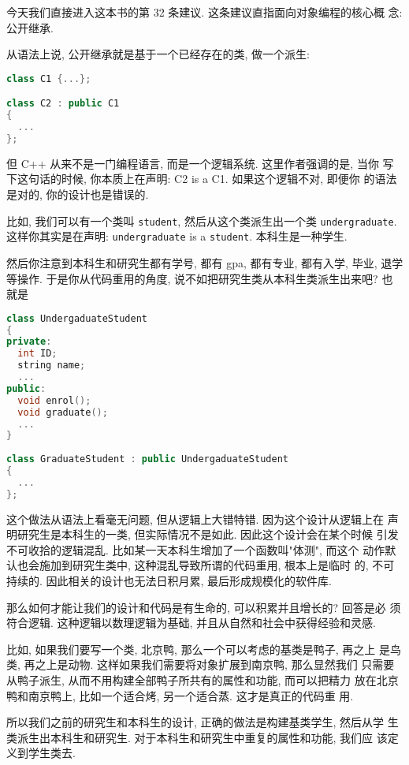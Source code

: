 \documentclass[a4paper]{ctexart}
\theoremstyle{definition}
\theoremstyle{definition}
\begin{document}
今天我们直接进入这本书的第 32 条建议. 这条建议直指面向对象编程的核心概
念: 公开继承.

从语法上说, 公开继承就是基于一个已经存在的类, 做一个派生:

\begin{lstlisting}[language=C++]
class C1 {...};

class C2 : public C1
{
  ...
};
\end{lstlisting}

但 C++ 从来不是一门编程语言, 而是一个逻辑系统. 这里作者强调的是, 当你
写下这句话的时候, 你本质上在声明: C2 is a C1. 如果这个逻辑不对, 即便你
的语法是对的, 你的设计也是错误的.

比如, 我们可以有一个类叫 \verb|student|, 然后从这个类派生出一个类
\verb|undergraduate|. 这样你其实是在声明: \verb|undergraduate| is a
\verb|student|. 本科生是一种学生.

然后你注意到本科生和研究生都有学号, 都有 gpa, 都有专业, 都有入学, 毕业,
退学等操作. 于是你从代码重用的角度, 说不如把研究生类从本科生类派生出来吧? 也就是

\begin{lstlisting}[language=C++]
class UndergaduateStudent
{
private:
  int ID;
  string name;
  ...
public:
  void enrol();
  void graduate();
  ...
} 
  
class GraduateStudent : public UndergaduateStudent
{
  ...
};
\end{lstlisting}

这个做法从语法上看毫无问题, 但从逻辑上大错特错. 因为这个设计从逻辑上在
声明研究生是本科生的一类, 但实际情况不是如此. 因此这个设计会在某个时候
引发不可收拾的逻辑混乱. 比如某一天本科生增加了一个函数叫"体测", 而这个
动作默认也会施加到研究生类中, 这种混乱导致所谓的代码重用, 根本上是临时
的, 不可持续的. 因此相关的设计也无法日积月累, 最后形成规模化的软件库.

那么如何才能让我们的设计和代码是有生命的, 可以积累并且增长的? 回答是必
须符合逻辑. 这种逻辑以数理逻辑为基础, 并且从自然和社会中获得经验和灵感.

比如, 如果我们要写一个类, 北京鸭, 那么一个可以考虑的基类是鸭子, 再之上
是鸟类, 再之上是动物. 这样如果我们需要将对象扩展到南京鸭, 那么显然我们
只需要从鸭子派生, 从而不用构建全部鸭子所共有的属性和功能, 而可以把精力
放在北京鸭和南京鸭上, 比如一个适合烤, 另一个适合蒸. 这才是真正的代码重
用.

所以我们之前的研究生和本科生的设计, 正确的做法是构建基类学生, 然后从学
生类派生出本科生和研究生. 对于本科生和研究生中重复的属性和功能, 我们应
该定义到学生类去.
\end{document}
